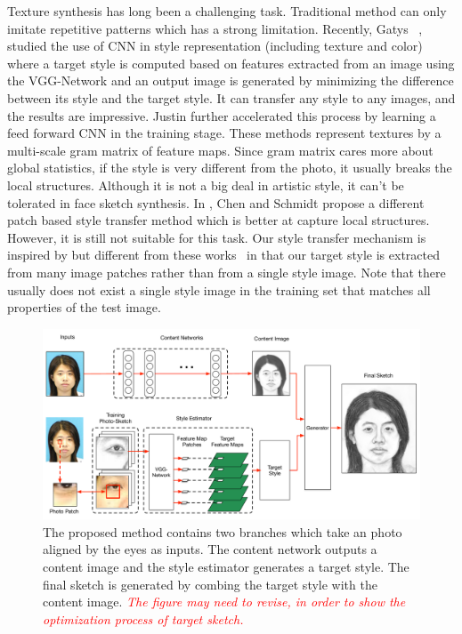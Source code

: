 \documentclass[10pt,twocolumn,letterpaper]{article}
\def\comm[#1]{{\small \textcolor{red}{\emph{#1}}}}
\begin{document}
Texture synthesis has long been a challenging task. Traditional method can only imitate repetitive patterns which has a strong limitation. Recently, Gatys \etal ~\cite{gatys2015texture,gatys2015neural}, studied the use of CNN in style representation (including texture and color) where a target style is computed based on features extracted from an image using the VGG-Network and an output image is generated by minimizing the difference between its style and the target style. It can transfer any style to any images, and the results are impressive. Justin \etal \cite{feifei2016} further accelerated this process by learning a feed forward CNN in the training stage. These methods represent textures by a multi-scale gram matrix of feature maps. Since gram matrix cares more about global statistics, if the style is very different from the photo, it usually breaks the local structures. Although it is not a big deal in artistic style, it can't be tolerated in face sketch synthesis. In \cite{Chen2016Patch}, Chen and Schmidt propose a different patch based style transfer method which is better at capture local structures. However, it is still not suitable for this task. Our style transfer mechanism is inspired by but different from these works~\cite{gatys2015texture,gatys2015neural,feifei2016} in that our target style is extracted from many image patches rather than from a single style image. Note that there usually does not exist a single style image in the training set that matches all properties of the test image. 

\begin{figure}[t]
\centering
\includegraphics[width=0.85\linewidth]{img/overview.pdf}
\caption{The proposed method contains two branches which take an photo aligned by the eyes as inputs. The content network outputs a content image and the style estimator generates a target style. The final sketch is generated by combing the target style with the content image. \comm[The figure may need to revise, in order to show the optimization process of target sketch.]}
\label{fig:overview}
\end{figure}
\end{document}
